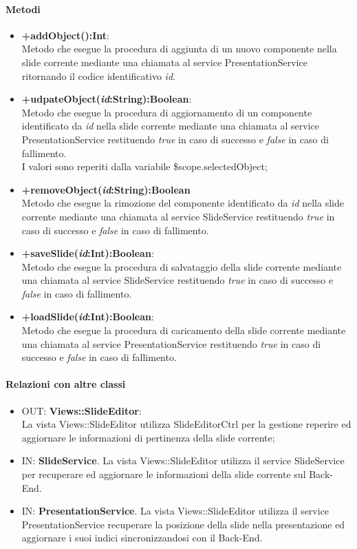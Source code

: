 	\paragraph{Metodi}
	\begin{itemize}
	  \item \textbf{+addObject():Int}:\\
		 Metodo che esegue la procedura di aggiunta di un nuovo componente nella slide corrente mediante una chiamata al service PresentationService ritornando il codice identificativo \textit{id}.
	  \item \textbf{+udpateObject(\textit{id}:String):Boolean}:\\
		 Metodo che esegue la procedura di aggiornamento di un componente  identificato da \textit{id} nella slide corrente mediante una chiamata al service PresentationService  restituendo \textit{true} in caso di successo e \textit{false} in caso di fallimento.\\I valori sono reperiti dalla variabile \$scope.selectedObject;
	  \item \textbf{+removeObject(\textit{id}:String):Boolean}\\
		 Metodo che esegue la rimozione del componente identificato da \textit{id} nella slide corrente mediante una chiamata al service SlideService  restituendo \textit{true} in caso di successo e \textit{false} in caso di fallimento.
	  \item \textbf{+saveSlide(\textit{id}:Int):Boolean}:\\
		 Metodo che esegue la procedura di salvataggio della slide corrente mediante una chiamata al service SlideService restituendo \textit{true} in caso di successo e \textit{false} in caso di fallimento.
	  \item \textbf{+loadSlide(\textit{id}:Int):Boolean}:\\
		 Metodo che esegue la procedura di caricamento della slide corrente mediante una chiamata al service PresentationService restituendo \textit{true} in caso di successo e \textit{false} in caso di fallimento.
	  	  
	\end{itemize}
	\paragraph{Relazioni con altre classi}
	\begin{itemize}
	  \item OUT: \textbf{Views::SlideEditor}:\\
		La vista Views::SlideEditor utilizza SlideEditorCtrl per la gestione reperire ed aggiornare le informazioni di pertinenza della slide corrente;	
	  \item IN: \textbf{SlideService}.
		La vista Views::SlideEditor utilizza il service SlideService per recuperare ed aggiornare le informazioni della slide corrente sul Back-End.	
	  \item IN: \textbf{PresentationService}.
		La vista Views::SlideEditor utilizza il service PresentationService recuperare la posizione della slide nella presentazione ed aggiornare i suoi indici sincronizzandosi con il Back-End.	
	\end{itemize}		
	
	
